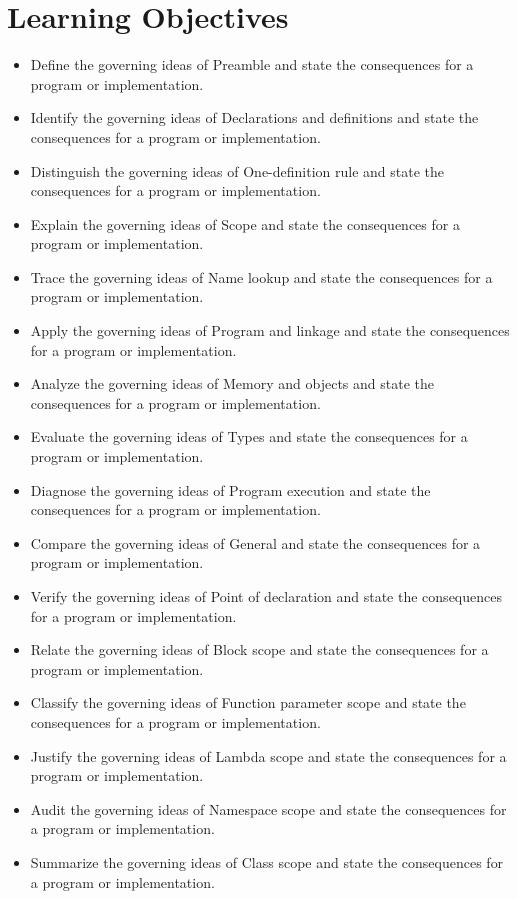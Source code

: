 \documentclass[11pt,letterpaper]{article}
\begin{document}
\section{Learning Objectives}
\begin{itemize}[label=\textcolor{CornellReferenceTeal}{$\blacktriangleright$}]
\item Define the governing ideas of Preamble and state the consequences for a program or implementation.
\item Identify the governing ideas of Declarations and definitions and state the consequences for a program or implementation.
\item Distinguish the governing ideas of One-definition rule and state the consequences for a program or implementation.
\item Explain the governing ideas of Scope and state the consequences for a program or implementation.
\item Trace the governing ideas of Name lookup and state the consequences for a program or implementation.
\item Apply the governing ideas of Program and linkage and state the consequences for a program or implementation.
\item Analyze the governing ideas of Memory and objects and state the consequences for a program or implementation.
\item Evaluate the governing ideas of Types and state the consequences for a program or implementation.
\item Diagnose the governing ideas of Program execution and state the consequences for a program or implementation.
\item Compare the governing ideas of General and state the consequences for a program or implementation.
\item Verify the governing ideas of Point of declaration and state the consequences for a program or implementation.
\item Relate the governing ideas of Block scope and state the consequences for a program or implementation.
\item Classify the governing ideas of Function parameter scope and state the consequences for a program or implementation.
\item Justify the governing ideas of Lambda scope and state the consequences for a program or implementation.
\item Audit the governing ideas of Namespace scope and state the consequences for a program or implementation.
\item Summarize the governing ideas of Class scope and state the consequences for a program or implementation.
\end{itemize}
\end{document}
